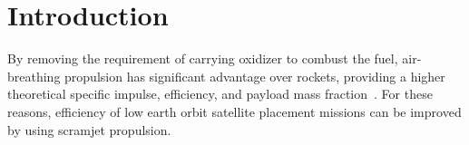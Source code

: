 \documentclass{AIAA}
\begin{document}
\maketitle



\section{Introduction}

By removing the requirement of carrying oxidizer to combust the fuel, air-breathing propulsion  has significant advantage over rockets, providing a higher theoretical specific impulse, efficiency, and payload mass fraction~\cite{SmartTetlow,CookHueter}.
For these reasons, efficiency of low earth orbit satellite placement missions can be improved by using scramjet propulsion.
\end{document}
